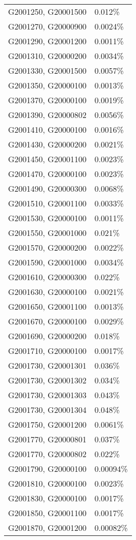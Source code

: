 \begin{longtable}[]{@{}ll@{}}
G2001250, G20001500 & 0.012\% \\
G2001270, G20000900 & 0.0024\% \\
G2001290, G20001200 & 0.0011\% \\
G2001310, G20000200 & 0.0034\% \\
G2001330, G20001500 & 0.0057\% \\
G2001350, G20000100 & 0.0013\% \\
G2001370, G20000100 & 0.0019\% \\
G2001390, G20000802 & 0.0056\% \\
G2001410, G20000100 & 0.0016\% \\
G2001430, G20000200 & 0.0021\% \\
G2001450, G20001100 & 0.0023\% \\
G2001470, G20000100 & 0.0023\% \\
G2001490, G20000300 & 0.0068\% \\
G2001510, G20001100 & 0.0033\% \\
G2001530, G20000100 & 0.0011\% \\
G2001550, G20001000 & 0.021\% \\
G2001570, G20000200 & 0.0022\% \\
G2001590, G20001000 & 0.0034\% \\
G2001610, G20000300 & 0.022\% \\
G2001630, G20000100 & 0.0021\% \\
G2001650, G20001100 & 0.0013\% \\
G2001670, G20000100 & 0.0029\% \\
G2001690, G20000200 & 0.018\% \\
G2001710, G20000100 & 0.0017\% \\
G2001730, G20001301 & 0.036\% \\
G2001730, G20001302 & 0.034\% \\
G2001730, G20001303 & 0.043\% \\
G2001730, G20001304 & 0.048\% \\
G2001750, G20001200 & 0.0061\% \\
G2001770, G20000801 & 0.037\% \\
G2001770, G20000802 & 0.022\% \\
G2001790, G20000100 & 0.00094\% \\
G2001810, G20000100 & 0.0023\% \\
G2001830, G20000100 & 0.0017\% \\
G2001850, G20001100 & 0.0017\% \\
G2001870, G20001200 & 0.00082\% \\

\end{longtable}
